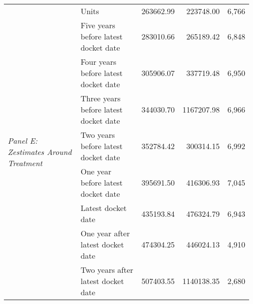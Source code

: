 \begin{tabular}{llrrr}
\cline{1-5}
\multirow[c]{9}{*}{\textit{Panel E: Zestimates Around Treatment}} & Units & 263662.99 & 223748.00 & 6,766 \\
 & Five years before latest docket date & 283010.66 & 265189.42 & 6,848 \\
 & Four years before latest docket date & 305906.07 & 337719.48 & 6,950 \\
 & Three years before latest docket date & 344030.70 & 1167207.98 & 6,966 \\
 & Two years before latest docket date & 352784.42 & 300314.15 & 6,992 \\
 & One year before latest docket date & 395691.50 & 416306.93 & 7,045 \\
 & Latest docket date & 435193.84 & 476324.79 & 6,943 \\
 & One year after latest docket date & 474304.25 & 446024.13 & 4,910 \\
 & Two years after latest docket date & 507403.55 & 1140138.35 & 2,680 \\
\cline{1-5}
\bottomrule
\end{tabular}
